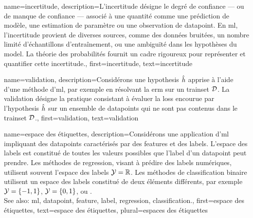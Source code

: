 {
	name={incertitude},
	description={L’incertitude désigne le degré de confiance — ou de manque de confiance — associé à une quantité comme une prédiction de modèle, une estimation de paramètre ou une observation de \gls{datapoint}. En \gls{ml}, l’incertitude provient de diverses sources, comme des données bruitées, un nombre limité d’échantillons d’entraînement, ou une ambiguïté dans les hypothèses du \gls{model}. La théorie des probabilités fournit un cadre rigoureux pour représenter et quantifier cette incertitude.},
	first={incertitude}, text={incertitude}
}

{
	name={validation},
	description={Considérons une \gls{hypothesis} $\hat{h}$ apprise à l’aide d’une méthode d'\gls{ml}, par exemple en résolvant la \gls{erm} sur un \gls{trainset} $\mathcal{D}$. La validation désigne la pratique consistant à évaluer la \gls{loss} encourue par l’\gls{hypothesis} $\hat{h}$ sur un ensemble de \glspl{datapoint} qui ne sont pas contenus dans le \gls{trainset} $\mathcal{D}$.},
	first={validation}, text={validation}
}

{
	name={espace des étiquettes},
	description={Considérons une application d'\gls{ml} impliquant des \glspl{datapoint} caractérisés par des \glspl{feature} et des \glspl{label}. L’espace des \glspl{label} est constitué de toutes les valeurs possibles que l'\gls{label} d’un \gls{datapoint} peut prendre. Les méthodes de \gls{regression}, visant à prédire des \glspl{label} numériques, utilisent souvent l’espace des \glspl{label} $\mathcal{Y} = \mathbb{R}$. Les méthodes de \gls{classification} binaire utilisent un espace des \glspl{label} constitué de deux éléments différents, par exemple $\mathcal{Y} =\{-1,1\}$, $\mathcal{Y}=\{0,1\}$, ou .\\
		See also: \gls{ml}, \gls{datapoint}, \gls{feature}, \gls{label}, \gls{regression}, \gls{classification}.}, 
	first={espace des étiquettes},
	text={espace des étiquettes}, plural={espaces des étiquettes}
}


